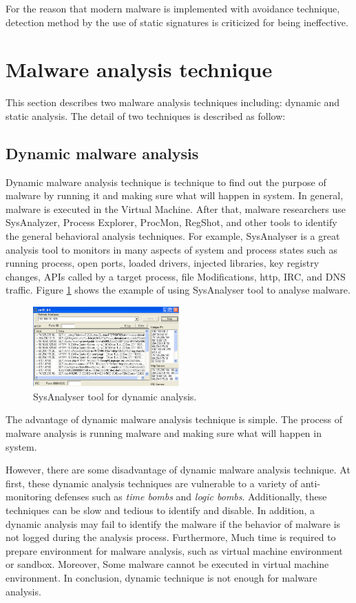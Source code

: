 For the reason that modern malware is implemented with avoidance technique, detection method by the use of static signatures is criticized for being ineffective.   
\section{Malware analysis technique}
This section describes two malware analysis techniques including: dynamic and static analysis. The detail of two techniques is described as follow: 
\subsection{Dynamic malware analysis}
Dynamic malware analysis technique is technique to find out the purpose of malware by running it and making sure what will happen in system. In general, malware is executed in the Virtual Machine. After that, malware researchers use SysAnalyzer, Process Explorer, ProcMon, RegShot, and other tools to identify the general behavioral analysis techniques. For example, SysAnalyser is a great analysis tool to monitors in many aspects of system and process states such as running process, open ports, loaded drivers, injected libraries, key registry changes, APIs called by a target process, file Modifications, http, IRC, and DNS traffic. Figure \ref{fig:SysAnalyser} shows the example of using SysAnalyser tool to analyse malware. 


\begin{figure}[h!]
\centering
\includegraphics[width=0.5\textwidth]{graph/SysAnalyser.png}
\caption{SysAnalyser tool for dynamic analysis.}
\label{fig:SysAnalyser}
\end{figure}

The advantage of dynamic malware analysis technique is simple. The process of malware analysis is running malware and making sure what will happen in 
system.

However, there are some disadvantage of dynamic malware analysis technique. At first, these dynamic analysis techniques are vulnerable to a variety of anti-monitoring defenses such as \emph{time bombs} and \emph{logic bombs}. Additionally, these techniques can be slow and tedious to identify and disable. In addition, a dynamic analysis may fail to identify the malware if the behavior of malware is not logged during the analysis process. Furthermore, Much time is required to prepare environment for malware analysis, such as virtual machine environment or sandbox. Moreover, Some malware cannot be executed in virtual machine environment. In conclusion, dynamic technique is not enough for malware analysis. 

